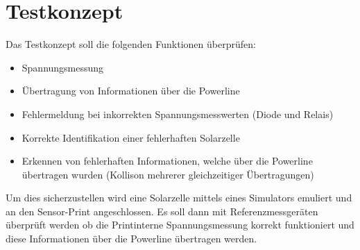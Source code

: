 %
%
%
\section{Testkonzept}

Das Testkonzept soll die folgenden Funktionen überprüfen:
\begin{itemize}
	\item Spannungsmessung
	\item Übertragung von Informationen über die Powerline
	\item Fehlermeldung bei inkorrekten Spannungsmesswerten (Diode und Relais)
	\item Korrekte Identifikation einer fehlerhaften Solarzelle
	\item Erkennen von fehlerhaften Informationen, welche über die Powerline übertragen wurden (Kollison mehrerer gleichzeitiger Übertragungen)
\end{itemize}

Um dies sicherzustellen wird eine Solarzelle mittels eines Simulators emuliert und an den Sensor-Print angeschlossen. Es soll dann mit Referenzmessgeräten überprüft werden ob die Printinterne Spannungsmessung korrekt funktioniert und diese Informationen über die Powerline übertragen werden. 
%